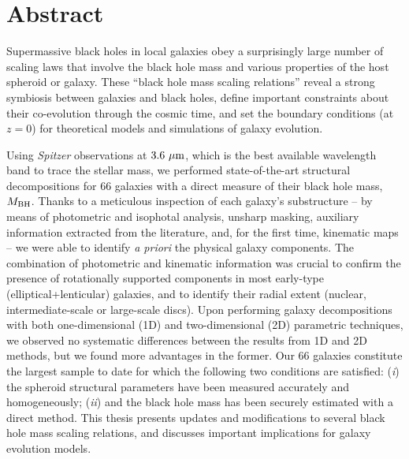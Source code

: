 \chapter*{Abstract}

Supermassive black holes in local galaxies obey a surprisingly large number of scaling laws 
that involve the black hole mass and various properties of the host spheroid or galaxy. 
These ``black hole mass scaling relations'' reveal a strong symbiosis between galaxies and black holes, 
define important constraints about their co-evolution through the cosmic time, 
and set the boundary conditions (at $z=0$) for theoretical models and simulations of galaxy evolution. 

Using \emph{Spitzer} observations at $3.6~\mu\rm m$, 
which is the best available wavelength band to trace the stellar mass, 
we performed state-of-the-art structural decompositions for $66$ galaxies 
with a direct measure of their black hole mass, $M_{\rm BH}$. 
Thanks to a meticulous inspection of each galaxy's substructure -- 
by means of photometric and isophotal analysis, unsharp masking, auxiliary information extracted from the literature, 
and, for the first time, kinematic maps -- 
we were able to identify \emph{a priori} the physical galaxy components. 
The combination of photometric and kinematic information was crucial 
to confirm the presence of rotationally supported components in most early-type (elliptical+lenticular) galaxies, 
and to identify their radial extent (nuclear, intermediate-scale or large-scale discs). 
Upon performing galaxy decompositions with both one-dimensional (1D) and two-dimensional (2D) parametric techniques, 
we observed no systematic differences between the results from 1D and 2D methods, 
but we found more advantages in the former. 
Our 66 galaxies constitute the largest sample to date 
for which the following two conditions are satisfied: 
(\emph{i}) the spheroid structural parameters have been measured accurately and homogeneously;  
(\emph{ii}) and the black hole mass has been securely estimated with a direct method. 
This thesis presents updates and modifications to several black hole mass scaling relations, 
and discusses important implications for galaxy evolution models. 

